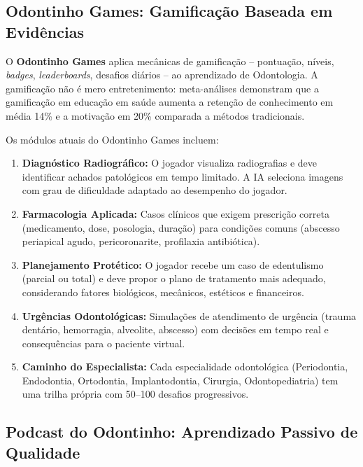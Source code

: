 \subsection{Odontinho Games: Gamificação Baseada em Evidências}

O \textbf{Odontinho Games} aplica mecânicas de gamificação -- pontuação, níveis,
\textit{badges}, \textit{leaderboards}, desafios diários -- ao aprendizado de
Odontologia. A gamificação não é mero entretenimento: meta-análises demonstram
que a gamificação em educação em saúde aumenta a retenção de conhecimento em
média 14\% e a motivação em 20\% comparada a métodos tradicionais.

Os módulos atuais do Odontinho Games incluem:

\begin{enumerate}
  \item \textbf{Diagnóstico Radiográfico:} O jogador visualiza radiografias e
    deve identificar achados patológicos em tempo limitado. A IA seleciona
    imagens com grau de dificuldade adaptado ao desempenho do jogador.

  \item \textbf{Farmacologia Aplicada:} Casos clínicos que exigem prescrição
    correta (medicamento, dose, posologia, duração) para condições comuns
    (abscesso periapical agudo, pericoronarite, profilaxia antibiótica).

  \item \textbf{Planejamento Protético:} O jogador recebe um caso de edentulismo
    (parcial ou total) e deve propor o plano de tratamento mais adequado,
    considerando fatores biológicos, mecânicos, estéticos e financeiros.

  \item \textbf{Urgências Odontológicas:} Simulações de atendimento de urgência
    (trauma dentário, hemorragia, alveolite, abscesso) com decisões em tempo
    real e consequências para o paciente virtual.

  \item \textbf{Caminho do Especialista:} Cada especialidade odontológica
    (Periodontia, Endodontia, Ortodontia, Implantodontia, Cirurgia,
    Odontopediatria) tem uma trilha própria com 50--100 desafios progressivos.
\end{enumerate}

\subsection{Podcast do Odontinho: Aprendizado Passivo de Qualidade}

